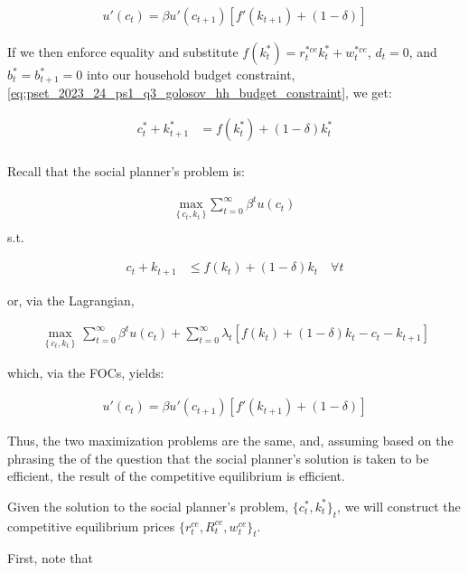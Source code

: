 \begin{align}
    u'(c_t) = \beta u'(c_{t+1})[f'(k_{t+1}) + (1 - \delta)] \label{eq:pset_2023_24_ps1_q3_golosov_euler2}
\end{align}

If we then enforce equality and substitute $f(k^*_{t}) = r^{*ce}_t k_t^* + w^{*ce}_t$, $d_t = 0$,
and $b^*_t = b^*_{t+1} = 0$ into our household budget constraint, \eqref{eq:pset_2023_24_ps1_q3_golosov_hh_budget_constraint},
we get:

\begin{align}
    c_t^* + k_{t+1}^* &= f(k^*_{t}) + (1 - \delta)k_t^* \\
\end{align}

Recall that the social planner's problem is:

\begin{align}
    \underset{\left\{c_t, k_t\right\}}{\text{max}} \sum_{t = 0}^\infty \beta^t u(c_t) \\
\end{align}
s.t.

\begin{align}
    c_t + k_{t+1} &\leq f(k_t) + (1 - \delta)k_t \quad \forall t
\end{align}

or, via the Lagrangian,

\begin{align}
    \max_{\left\{c_t, k_t\right\}} \sum_{t = 0}^\infty \beta^t u(c_t) + \sum_{t=0}^\infty \lambda_t\left[f(k_t) + (1 - \delta)k_t - c_t - k_{t+1}\right]
\end{align}

which, via the FOCs, yields: 

\begin{align}
    u'(c_t) = \beta u'(c_{t+1})[f'(k_{t+1}) + (1 - \delta)] 
\end{align}

Thus, the two maximization problems are the same, and, assuming based 
on the phrasing the of the question that the social planner's 
solution is taken to be efficient, the result of the 
competitive equilibrium is efficient.




Given the solution to the social planner's problem, $\{c_t^*, k_t^*\}_t$,
we will construct the competitive equilibrium prices $\{r_t^{ce}, R_t^{ce}, w_t^{ce}\}_t$.

First, note that

